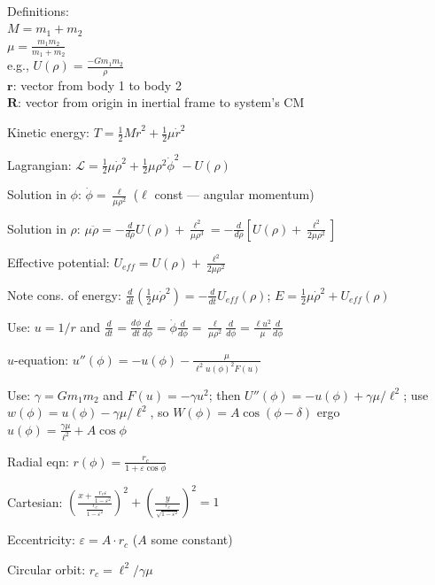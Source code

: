 \documentclass[letterpaper,landscape,10pt]{article}
\newenvironment{mydescription}
{\begin{description}
	\setlength{\itemsep}{0pt}
	\setlength{\parskip}{0pt}
	\setlength{\parsep}{-1pt}}
{\end{description}}
\begin{document}
{\begin{multicols}{4}
\begin{minipage}{.62\columnwidth}
	  \end{minipage}\\
		\begin{mydescription}
		  \item[Definitions:] \ \\
			$M=m_1+m_2$ \\
			$\mu=\frac{m_1m_2}{m_1+m_2}$ \\
			e.g., $U(\rho)=\frac{-Gm_1m_2}{\rho}$ \\
			$\bm{r}$: vector from body 1 to body 2 \\
			$\bm{R}$: vector from origin in inertial frame to system's CM
		  \item[Kinetic energy:] $T=\frac{1}{2}M\dot{r}^2+\frac{1}{2}\mu\dot{r}^2$
		  \item[Lagrangian:] $\mathscr{L}=\frac{1}{2}\mu\dot{\rho}^2+\frac{1}{2}\mu{\rho}^2\dot{\phi}^2-U(\rho)$
		  \item[Solution in $\phi$:] $\dot\phi=\frac{\ell}{\mu\rho^2}$ ($\ell$ const --- angular momentum)
		  \item[Solution in $\rho$:] $\mu\ddot{\rho}=-\frac{d}{d\rho}U(\rho) + \frac{\ell^2}{\mu\rho^3} = -\frac{d}{d\rho}\left[U(\rho)+\frac{\ell^2}{2\mu\rho^2}\right]$
		  \item[Effective potential:]$U_{eff}=U(\rho)+\frac{\ell^2}{2\mu\rho^2}$
		  \item[Note cons. of energy:] $\frac{d}{dt}\left( \frac{1}{2}\mu\dot\rho^2 \right) = -\frac{d}{dt}U_{eff}(\rho)$; $E=\frac{1}{2}\mu\dot\rho^2+U_{eff}(\rho)$
		  \item[Use:]$u=1/r$ and $\frac{d}{dt}=\frac{d\phi}{dt}\frac{d}{d\phi}=\dot\phi\frac{d}{d\phi}=\frac{\ell}{\mu\rho^2}\frac{d}{d\phi}=\frac{\ell u^2}{\mu}\frac{d}{d\phi}$
		  \item[$u$-equation:]$u''(\phi)=-u(\phi)-\frac{\mu}{\ell^2u(\phi)^2F(u)}$
		  \item[Use:]$\gamma=Gm_1m_2$ and $F(u)=-\gamma u^2$; then $U''(\phi)=-u(\phi)+\gamma\mu/\ell^2$; use $w(\phi)=u(\phi)-\gamma\mu/\ell^2$, so $W(\phi)=A\cos(\phi-\delta)$ ergo $u(\phi)=\frac{\gamma\mu}{\ell^2}+A\cos\phi$
		  \item[Radial eqn:] $r(\phi)=\frac{r_c}{1+\varepsilon\cos\phi}$
		  \item[Cartesian:] $\left( \frac{x+\frac{r_c\varepsilon}{1-\varepsilon^2}}{\frac{r_c}{1-\varepsilon^2}} \right)^2+\left( \frac{y}{\frac{r_c}{\sqrt{1-\varepsilon^2}}} \right)^2 = 1$
		  \item[Eccentricity:] $\varepsilon=A\cdot r_c$ ($A$ some constant)
		  \item[Circular orbit:] $r_c=\ell^2/\gamma\mu$

\end{mydescription}
\end{multicols}}
\end{document}
